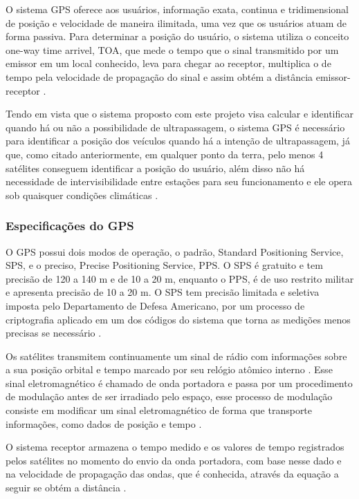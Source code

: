 O sistema GPS oferece aos usuários, informação exata, continua e
tridimensional de posição e velocidade de maneira ilimitada, uma
vez que os usuários atuam de forma passiva. Para determinar a posição
do usuário, o sistema utiliza o conceito one-way time arrivel, TOA, que
mede o tempo que o sinal transmitido por um emissor em um local conhecido,
leva para chegar ao receptor, multiplica o de tempo pela velocidade de
propagação do sinal e assim obtém a distância emissor-receptor \cite{sobre_gps}.

Tendo em vista que o sistema proposto com este projeto visa calcular e
identificar quando há ou não a possibilidade de ultrapassagem, o sistema
GPS é necessário para identificar a posição dos veículos quando há a
intenção de ultrapassagem, já que, como citado anteriormente, em qualquer
ponto da terra, pelo menos 4 satélites conseguem identificar a posição do
usuário, além disso não há necessidade de intervisibilidade entre estações
para seu funcionamento e ele opera sob quaisquer condições climáticas \cite{sobre_gps}.

\subsubsection{Especificações do GPS}

O GPS possui dois modos de operação, o padrão, Standard Positioning Service,
SPS, e o preciso, Precise Positioning Service, PPS. O SPS é gratuito e tem
precisão de 120 a 140 m e de 10 a 20 m, enquanto o PPS, é de uso restrito
militar e apresenta precisão de 10 a 20 m. O SPS tem precisão limitada e
seletiva imposta pelo Departamento de Defesa Americano, por um processo de
criptografia aplicado em um dos códigos do sistema que torna as medições
menos precisas se necessário \cite{6gps}.

Os satélites transmitem continuamente um sinal de rádio com informações sobre
a sua posição orbital e tempo marcado por seu relógio atômico interno \cite{7gps}.
 Esse sinal eletromagnético é chamado de onda portadora e passa por um
 procedimento de modulação antes de ser irradiado pelo espaço, esse processo
 de modulação consiste em modificar um sinal eletromagnético de forma que
 transporte informações, como dados de posição e tempo \cite{8gps}.

O sistema receptor armazena o tempo medido e os valores de tempo registrados
pelos satélites no momento do envio da onda portadora, com base nesse dado e
 na velocidade de propagação das ondas, que é conhecida, através da equação
 a seguir se obtém a distância \cite{8gps}.

